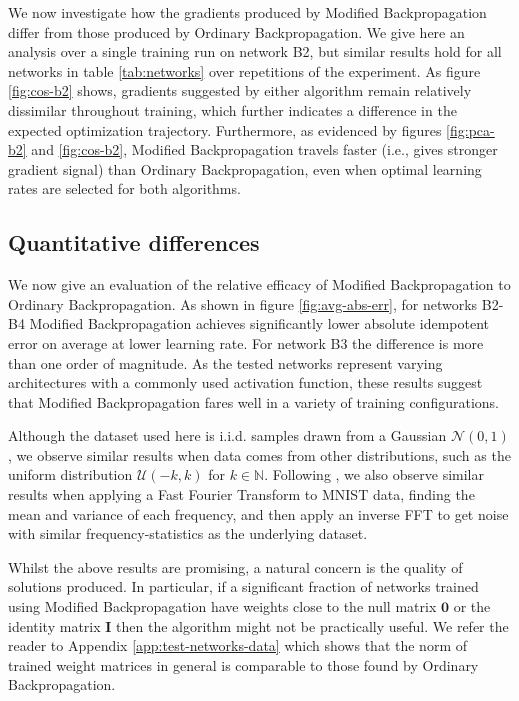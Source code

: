 \documentclass{article}
\theoremstyle{plain}
\theoremstyle{definition}
\theoremstyle{remark}
\newcommand{\vI}{\mathbf{I}}
\begin{document}
We now investigate how the gradients produced by Modified Backpropagation differ from those produced by Ordinary Backpropagation. We give here an analysis over a single training run on network B2, but similar results hold for all networks in table \ref{tab:networks} over repetitions of the experiment. As figure \ref{fig:cos-b2} shows, gradients suggested by either algorithm remain relatively dissimilar throughout training, which further indicates a difference in the expected optimization trajectory. Furthermore, as evidenced by figures \ref{fig:pca-b2} and \ref{fig:cos-b2}, Modified Backpropagation travels faster (i.e., gives stronger gradient signal) than Ordinary Backpropagation, even when optimal learning rates are selected for both algorithms.

\subsection{Quantitative differences}
\label{sec:experiment-quant}
We now give an evaluation of the relative efficacy of Modified Backpropagation to Ordinary Backpropagation. As shown in figure \ref{fig:avg-abs-err}, for networks B2-B4 Modified Backpropagation achieves significantly lower absolute idempotent error on average at lower learning rate. For network B3 the difference is more than one order of magnitude. As the tested networks represent varying architectures with a commonly used activation function, these results suggest that Modified Backpropagation fares well in a variety of training configurations.

Although the dataset used here is i.i.d. samples drawn from a Gaussian $\mathcal{N}(0, 1)$, we observe similar results when data comes from other distributions, such as the uniform distribution $\mathcal{U}(-k, k)$ for $k \in \mathbb{N}$. Following \cite{shocher-ign}, we also observe similar results when applying a Fast Fourier Transform to MNIST data, finding the mean and variance of each frequency, and then apply an inverse FFT to get noise with similar frequency-statistics as the underlying dataset.

Whilst the above results are promising, a natural concern is the quality of solutions produced. In particular, if a significant fraction of networks trained using Modified Backpropagation have weights close to the null matrix $\bm{0}$ or the identity matrix $\vI$ then the algorithm might not be practically useful. We refer the reader to Appendix \ref{app:test-networks-data} which shows that the norm of trained weight matrices in general is comparable to those found by Ordinary Backpropagation.
\end{document}
